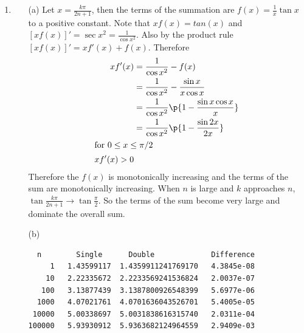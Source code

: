 \documentclass[11pt]{article}
\begin{document}
\begin{enumerate}
    \item %
        \begin{enumerate}
            \item[(a)]
                Let $x = \frac{k\pi}{2n + 1}$, then the terms of the summation
                are $f(x) = \frac{1}{x} \tan{x}$ to a positive constant.
                Note that $xf(x) = tan(x)$ and $[xf(x)]' = \sec{x}^2 = \frac{1}{\cos{x}^2}$.
                Also by the product rule $[xf(x)]' = xf'(x) + f(x)$.
                Therefore
                \begin{align*}
                    xf'(x) &= \frac{1}{\cos{x}^2} - f(x) \\
                    &= \frac{1}{\cos{x}^2} - \frac{\sin{x}}{x \cos{x}} \\
                    &= \frac{1}{\cos{x}^2} \p{1 - \frac{\sin{x}\cos{x}}{x}} \\
                    &= \frac{1}{\cos{x}^2} \p{1 - \frac{\sin{2x}}{2x}} \\
                    \intertext{for $0 \le x \le \pi/2$}
                    xf'(x) > 0
                \end{align*}
                Therefore the $f(x)$ is monotonically increasing and the terms of the
                sum are monotonically increasing.
                When $n$ is large and $k$ approaches $n$,
                $\tan{\frac{k\pi}{2n + 1}} \to \tan{\frac{\pi}{2}}$.
                So the terms of the sum become very large and dominate the overall
                sum.

            \item[(b)]
                \begin{verbatim}
  n        Single      Double             Difference
     1   1.43599117  1.4359911241769170   4.3845e-08
    10   2.22335672  2.2233569241536824   2.0037e-07
   100   3.13877439  3.1387800926548399   5.6977e-06
  1000   4.07021761  4.0701636043526701   5.4005e-05
 10000   5.00338697  5.0031838616315740   2.0311e-04
100000   5.93930912  5.9363682124964559   2.9409e-03
                \end{verbatim}
                
                
        \end{enumerate}


\end{enumerate}
\end{document}
